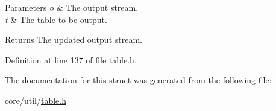 \begin{DoxyParams}{Parameters}
{\em o} & The output stream. \\
\hline
{\em t} & The table to be output. \\
\hline
\end{DoxyParams}
\begin{DoxyReturn}{Returns}
The updated output stream. 
\end{DoxyReturn}


Definition at line 137 of file table.\+h.



The documentation for this struct was generated from the following file\+:\begin{DoxyCompactItemize}
\item 
core/util/\hyperlink{table_8h}{table.\+h}\end{DoxyCompactItemize}
